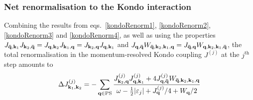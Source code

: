 \documentclass[reprint,hidelinks,onecolumn]{revtex4-2}
\begin{document}
\subsubsection*{Net renormalisation to the Kondo interaction}
Combining the results from eqs.~\ref{kondoRenorm1}, \ref{kondoRenorm2}, \ref{kondoRenorm3} and \ref{kondoRenorm4}, as well as using the properties \(J_{{\bf \bar q}, {\bf k}_1} J_{{\bf k}_2,{\bf \bar q}} = J_{{\bf q}, {\bf k}_2} J_{{\bf k}_1,{\bf q}} = J_{{\bf k}_2, {\bf q}} J_{{\bf q},{\bf k}_1}\) and \(J_{{\bf q}, {\bf \bar q}} W_{{\bf \bar q}, {\bf k}_2, {\bf k}_1, {\bf q}} = J_{{\bf \bar q}, {\bf q}} W_{{\bf q}, {\bf k}_2, {\bf k}_1, {\bf \bar q}}\), the total renormalisation in the momentum-resolved Kondo coupling \(J^{(j)}\) at the \(j^\text{th}\) step amounts to
\begin{equation}\begin{aligned}
	\Delta J^{(j)}_{{\bf k}_1, {\bf k}_2} = -\sum_{{\bf q} \in \text{PS}} \frac{J^{(j)}_{{\bf k}_2,{\bf q}} J^{(j)}_{{\bf q},{\bf k}_1} + 4J^{(j)}_{{\bf q}, {\bf \bar q}} W_{{\bf \bar q}, {\bf k}_2, {\bf k}_1, {\bf q}}}{\omega - \frac{1}{2}|\varepsilon_j| + J^{(j)}_{{\bf q}}/4 + W_{{\bf q}}/2}
\end{aligned}\end{equation}


\end{document}
